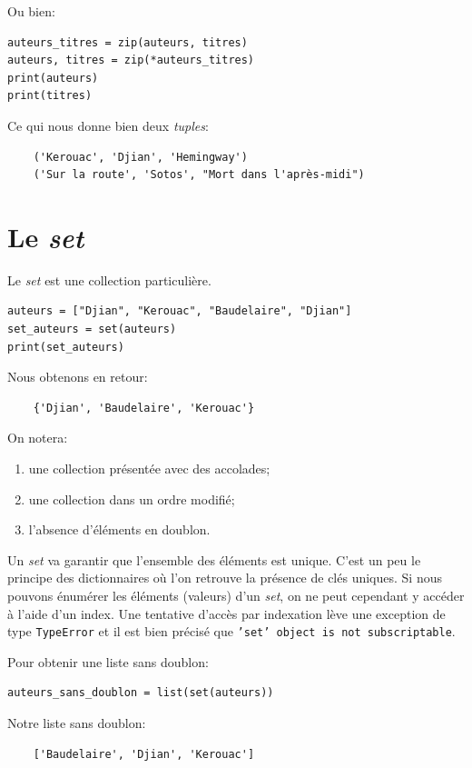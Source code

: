 \documentclass[a4paper,11pt]{book}
\begin{document}
Ou bien:
\begin{lstlisting}
auteurs_titres = zip(auteurs, titres)
auteurs, titres = zip(*auteurs_titres)
print(auteurs)
print(titres)
\end{lstlisting}
\medskip

Ce qui nous donne bien deux \textit{tuples}:
\begin{verbatim}
    ('Kerouac', 'Djian', 'Hemingway')
    ('Sur la route', 'Sotos', "Mort dans l'après-midi")
\end{verbatim}
\medskip

\section{Le \textit{set}}
Le \textit{set} est une collection particulière.
\begin{lstlisting}
auteurs = ["Djian", "Kerouac", "Baudelaire", "Djian"]
set_auteurs = set(auteurs)
print(set_auteurs)
\end{lstlisting}
\medskip

Nous obtenons en retour:
\begin{verbatim}
    {'Djian', 'Baudelaire', 'Kerouac'}
\end{verbatim}
\medskip

On notera:
\begin{enumerate}
	\item une collection présentée avec des accolades;
	\item une collection dans un ordre modifié;
	\item l'absence d'éléments en doublon.
\end{enumerate} 
\medskip

Un \textit{set} va garantir que l'ensemble des éléments est unique. C'est un peu le principe des dictionnaires où l'on retrouve la présence de clés uniques. Si nous pouvons énumérer les éléments (valeurs) d'un \textit{set}, on ne peut cependant y accéder à l'aide d'un index. Une tentative d'accès par indexation lève une exception de type \texttt{TypeError} et il est bien précisé que \texttt{'set' object is not subscriptable}.
\medskip

Pour obtenir une liste sans doublon:
\begin{lstlisting}
auteurs_sans_doublon = list(set(auteurs))
\end{lstlisting}
\medskip

Notre liste sans doublon:
\begin{verbatim}
    ['Baudelaire', 'Djian', 'Kerouac']
\end{verbatim}
\medskip
\end{document}
